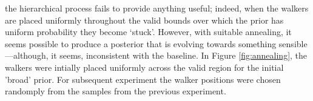 \documentclass{tufte-handout}
\begin{document}
 the hierarchical process fails to
provide anything useful; indeed, when the walkers are placed uniformly
throughout the valid bounds over which the prior has uniform
probability they become `stuck'. However, with suitable annealing, it
seems possible to produce a posterior that is evolving towards
something sensible---although, it seems, inconsistent with the
baseline. In Figure \ref{fig:annealing}, the walkers were intially
placed uniformly across the valid region for the initial 'broad'
prior. For subsequent experiment the walker positions were chosen
randomply from the samples from the previous experiment.
\end{document}
